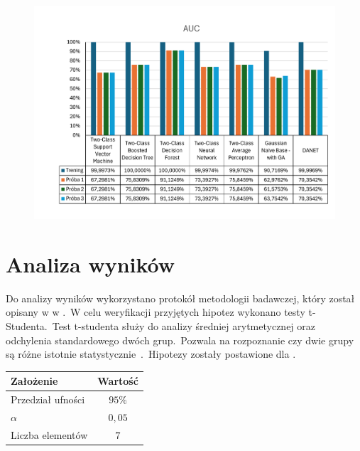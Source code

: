 \begin{figure}[H]
    \centering
    \includegraphics[width=\textwidth]{images/auc-res}
    \label{fig:auc-res}
\end{figure}


\section{Analiza wyników}
Do analizy wyników wykorzystano protokół metodologii badawczej, który został opisany w  w .\ W celu weryfikacji przyjętych hipotez wykonano testy t-Studenta.\ Test t-studenta służy do analizy średniej arytmetycznej oraz odchylenia standardowego dwóch grup.\ Pozwala na rozpoznanie czy dwie grupy są różne istotnie statystycznie~\cite{tstudent}.\ Hipotezy zostały postawione dla .

\begin{table}[H]
    \centering
    \begin{tabular}{|l|c|}
        \hline
        \textbf{Założenie} & \textbf{Wartość} \\ \hline
        Przedział ufności  & $95\%$           \\ \hline
        $\alpha$           & $0,05$           \\ \hline
        Liczba elementów   & $7$              \\ \hline
    \end{tabular}
    \label{tab:stat}
\end{table}

